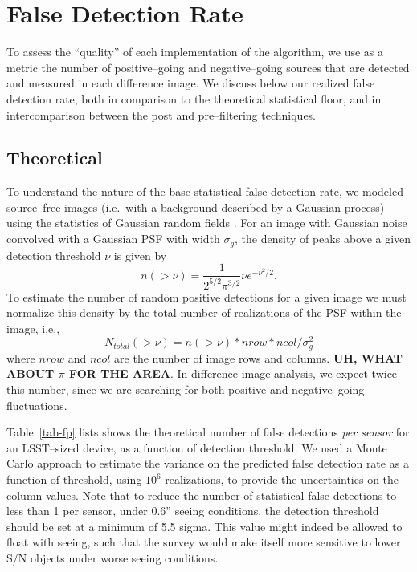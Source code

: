 \documentclass[iop]{emulateapj}
\begin{document}
\section{False Detection Rate}

To assess the ``quality'' of each implementation of the algorithm, we use as a metric the number of positive--going and negative--going sources that are detected and measured in each difference image.
We discuss below our realized false detection rate, both in comparison to the theoretical statistical floor, and in intercomparison between the post and pre--filtering techniques.

\subsection{Theoretical \label{sec-analyticfp}}

To understand the nature of the base statistical false detection rate, we modeled source--free images (i.e.\ with a background described by a Gaussian process) using the statistics of Gaussian random fields \citep{Kaiser-PointSources}.
For an image with Gaussian noise convolved with a Gaussian PSF with width $\sigma_g$, the density of peaks above a given detection threshold $\nu$ is given by
\begin{equation}
n(>\nu) = \frac{1}{2^{5/2}\pi^{3/2}} \nu e^{-\nu^2 /2}.
\label{eq-theory}
\end{equation}
To estimate the number of random positive detections for a given image we must normalize this density by the total number of realizations of the PSF within the image, i.e.,
\begin{equation}
N_{total}(>\nu) = n(>\nu)*nrow*ncol/ \sigma_g^2
\label{eq-theorytot}
\end{equation}
where $nrow$ and $ncol$ are the number of image rows and columns.
{\bf UH, WHAT ABOUT $\pi$ FOR THE AREA}.
In difference image analysis, we expect twice this number, since we are searching for both positive and negative--going fluctuations.

Table~\ref{tab-fp} lists shows the theoretical number of false detections {\it per sensor} for an LSST--sized device, as a function of detection threshold.
We used a Monte Carlo approach to estimate the variance on the predicted false detection rate as a function of threshold, using $10^6$ realizations, to provide the uncertainties on the column values.
Note that to reduce the number of statistical false detections to less than 1 per sensor, under 0.6'' seeing conditions, the detection threshold should be set at a minimum of 5.5 sigma.
This value might indeed be allowed to float with seeing, such that the survey would make itself more sensitive to lower S/N objects under worse seeing conditions.
\end{document}
